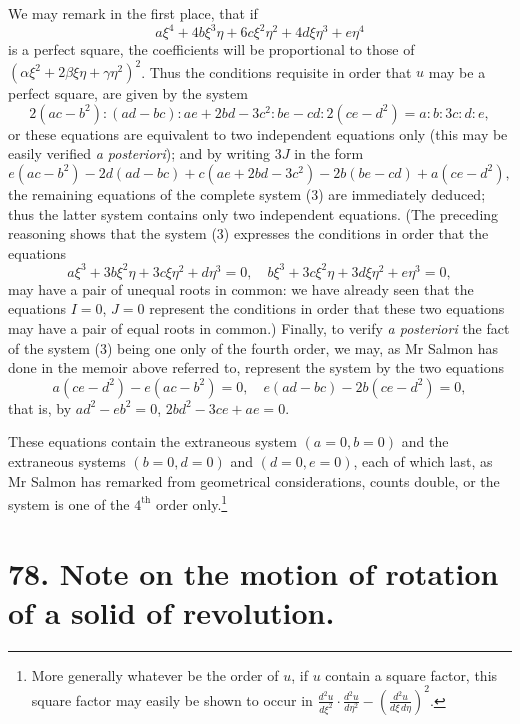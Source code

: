 \documentclass[11pt,a4paper]{article}
\theoremstyle{definition}
\begin{document}
We may remark in the first place, that if
\[
a\xi^{4} + 4b\xi^{3}\eta + 6c\xi^{2}\eta^{2} + 4d\xi\eta^{3} + e\eta^{4}
\]
is a perfect square, the coefficients will be proportional to those of $(\alpha\xi^{2} + 2\beta\xi\eta + \gamma\eta^{2})^{2}$. Thus the conditions requisite in order that $u$ may be a perfect square, are given by the system
\[
2(ac - b^{2}) : (ad - bc) : ae + 2bd - 3c^{2} : be - cd : 2(ce - d^{2}) = a : b : 3c : d : e,
\]
or these equations are equivalent to two independent equations only (this may be easily verified \textit{a posteriori}); and by writing $3J$ in the form
\[
e(ac - b^{2}) - 2d(ad - bc) + c(ae + 2bd - 3c^{2}) - 2b(be - cd) + a(ce - d^{2}),
\]
the remaining equations of the complete system (3) are immediately deduced; thus the latter system contains only two independent equations. (The preceding reasoning shows that the system (3) expresses the conditions in order that the equations
\[
a\xi^{3} + 3b\xi^{2}\eta + 3c\xi\eta^{2} + d\eta^{3} = 0, \quad b\xi^{3} + 3c\xi^{2}\eta + 3d\xi\eta^{2} + e\eta^{3} = 0,
\]
may have a pair of unequal roots in common: we have already seen that the equations $I = 0$, $J = 0$ represent the conditions in order that these two equations may have a pair of equal roots in common.) Finally, to verify \textit{a posteriori} the fact of the system (3) being one only of the fourth order, we may, as Mr Salmon has done in the memoir above referred to, represent the system by the two equations
\[
a(ce - d^{2}) - e(ac - b^{2}) = 0, \quad e(ad - bc) - 2b(ce - d^{2}) = 0,
\]
that is, by $ad^{2} - eb^{2} = 0$, $2bd^{2} - 3ce + ae = 0$.

These equations contain the extraneous system $(a = 0, b = 0)$ and the extraneous systems $(b = 0, d = 0)$ and $(d = 0, e = 0)$, each of which last, as Mr Salmon has remarked from geometrical considerations, counts double, or the system is one of the $4^{\text{th}}$ order only.\footnote{More generally whatever be the order of $u$, if $u$ contain a square factor, this square factor may easily be shown to occur in $\frac{d^{2}u}{d\xi^{2}} \cdot \frac{d^{2}u}{d\eta^{2}} - \left(\frac{d^{2}u}{d\xi\, d\eta}\right)^{2}$.}



\newpage
\section*{78. Note on the motion of rotation of a solid of revolution.}
\end{document}
